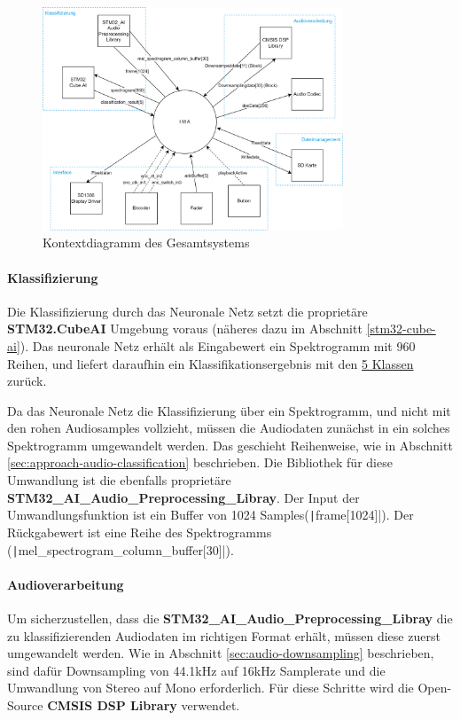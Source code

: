 \begin{figure}[H]
   	\centering
   	\includegraphics[width=0.8\textwidth]{images/04_spezifikation/kontextdiagramm_gesamt.drawio.png}
   	\caption{Kontextdiagramm des Gesamtsystems}
   	\label{fig:context_diagram_gesamt}
\end{figure}

\paragraph{Klassifizierung}

Die Klassifizierung durch das Neuronale Netz setzt die proprietäre \textbf{STM32.CubeAI} Umgebung voraus (näheres dazu im Abschnitt \ref{stm32-cube-ai}). Das neuronale Netz erhält als Eingabewert ein Spektrogramm mit 960 Reihen, und liefert daraufhin ein Klassifikationsergebnis mit den \hyperlink{nn-classes}{5 Klassen} zurück.

Da das Neuronale Netz die Klassifizierung über ein Spektrogramm, und nicht mit den rohen Audiosamples vollzieht, müssen die Audiodaten zunächst in ein solches Spektrogramm umgewandelt werden. Das geschieht Reihenweise, wie in Abschnitt \ref{sec:approach-audio-classification} beschrieben. Die Bibliothek für diese Umwandlung ist die ebenfalls proprietäre \textbf{STM32\_AI\_Audio\_Preprocessing\_Libray}. Der Input der Umwandlungsfunktion ist ein Buffer von 1024 Samples(\texttt|frame[1024]|). Der Rückgabewert ist eine Reihe des Spektrogramms (\texttt|mel_spectrogram_column_buffer[30]|).

\paragraph{Audioverarbeitung}

Um sicherzustellen, dass die \textbf{STM32\_AI\_Audio\_Preprocessing\_Libray} die zu klassifizierenden Audiodaten im richtigen Format erhält, müssen diese zuerst umgewandelt werden. Wie in Abschnitt \ref{sec:audio-downsampling} beschrieben, sind dafür Downsampling von 44.1kHz auf 16kHz Samplerate und die Umwandlung von Stereo auf Mono erforderlich. Für diese Schritte wird die Open-Source \textbf{CMSIS DSP Library} verwendet.

